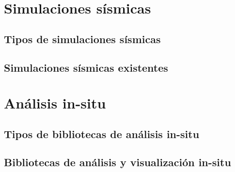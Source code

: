 \section{Simulaciones sísmicas}
\subsection{Tipos de simulaciones sísmicas}
\subsection{Simulaciones sísmicas existentes}
\section{Análisis in-situ}
\subsection{Tipos de bibliotecas de análisis in-situ}
\subsection{Bibliotecas de análisis y visualización in-situ}
